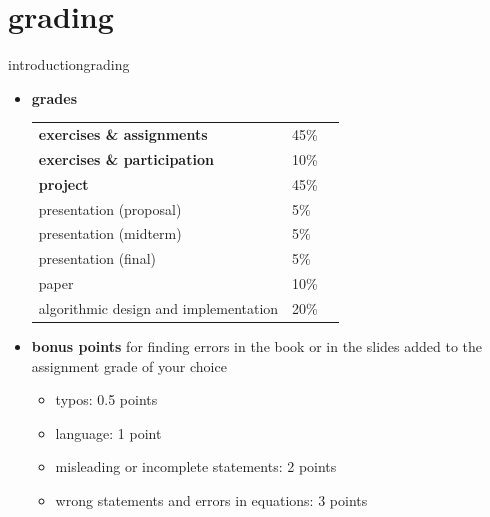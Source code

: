    \section[grades]{grading}
        \begin{frame}{introduction}{grading}
            \vspace{-4mm}
            \begin{itemize}
                \item \textbf{grades}
                    \begin{table}
                    \begin{tabular}{lll}
                        \textbf{exercises \& assignments} & 45\%\\
                        \textbf{exercises \& participation} & 10\%\\
                        \textbf{project} & 45\% \\
                        \quad presentation (proposal) & 5\%\\
                        \quad presentation (midterm) & 5\%\\
                        \quad presentation (final) & 5\%\\
                        \quad paper & 10\%\\
                        \quad algorithmic design and implementation & 20\%\\
                    \end{tabular}   
                    \end{table}
            
                \smallskip
                \item<2->   \textbf{bonus points} for finding errors in the book or in the slides added to the assignment grade of your choice
                    \begin{itemize}
                        \item   typos: 0.5 points
                        \item   language: 1 point
                        \item   misleading or incomplete statements: 2 points
                        \item   wrong statements and errors in equations: 3 points
                    \end{itemize}
            \end{itemize}
        \end{frame}


